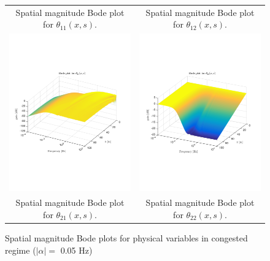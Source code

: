 \documentclass[preprint]{elsarticle}
\begin{document}
\begin{figure}
\begin{tabular}{cc}
\tabularnewline
Spatial magnitude Bode plot for $\theta_{11}(x,s)$.
&
Spatial magnitude Bode plot for $\theta_{12}(x,s)$.
\tabularnewline
\includegraphics[trim = 0mm 60mm 0mm 60mm, width = 8cm]{Bode_congested/distr_theta_21}
&
\includegraphics[trim = 0mm 60mm 0mm 60mm, width = 8cm]{Bode_congested/distr_theta_22}
\tabularnewline
Spatial magnitude Bode plot for $\theta_{21}(x,s)$.
&
Spatial magnitude Bode plot for $\theta_{22}(x,s)$.
\tabularnewline
\end{tabular}
\caption{Spatial magnitude Bode plots for physical variables in congested regime ($\left|\alpha\right| = $ 0.05 Hz)\label{fig:Magn_spatial_physx_congested}}
\end{figure}
\end{document}
